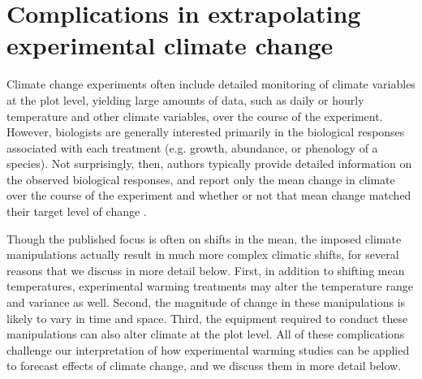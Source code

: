 \documentclass{article}
\begin{document}
\section* {Complications in extrapolating experimental climate change}
Climate change experiments often include detailed monitoring of climate variables at the plot level, yielding large amounts of data, such as daily or hourly temperature and other climate variables, over the course of the experiment. However, biologists are generally interested primarily in the biological responses associated with each treatment (e.g. growth, abundance, or phenology of a species). Not surprisingly, then, authors typically provide detailed information on the observed biological responses, and report only the mean change in climate over the course of the experiment and whether or not that mean change matched their target level of change \citep[e.g.][]{price1998,clark2014a,clark2014b,rollinson2012}. 
\par Though the published focus is often on shifts in the mean, the imposed climate manipulations actually result in much more complex climatic shifts, for several reasons that we discuss in more detail below. First, in addition to shifting mean temperatures, experimental warming treatments may alter the temperature range and variance as well. Second, the magnitude of change in these manipulations is likely to vary in time and space. Third, the equipment required to conduct these manipulations can also alter climate at the plot level. All of these complications challenge our interpretation of how experimental warming studies can be applied to forecast effects of climate change, and we discuss them in more detail below.
\end{document}
